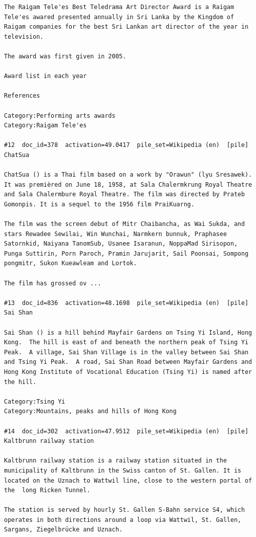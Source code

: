 \begin{verbatim}
The Raigam Tele'es Best Teledrama Art Director Award is a Raigam Tele'es awared presented annually in Sri Lanka by the Kingdom of Raigam companies for the best Sri Lankan art director of the year in television.

The award was first given in 2005.

Award list in each year

References

Category:Performing arts awards
Category:Raigam Tele'es

#12  doc_id=378  activation=49.0417  pile_set=Wikipedia (en)  [pile]
ChatSua

ChatSua () is a Thai film based on a work by "Orawun" (lyu Sresawek). It was premièred on June 18, 1958, at Sala Chalermkrung Royal Theatre and Sala Chalermbure Royal Theatre. The film was directed by Prateb Gomonpis. It is a sequel to the 1956 film PraiKuarng.

The film was the screen debut of Mitr Chaibancha, as Wai Sukda, and stars Rewadee Sewilai, Win Wunchai, Narmkern bunnuk, Praphasee Satornkid, Naiyana TanomSub, Usanee Isaranun, NoppaMad Sirisopon, Punga Suttirin, Porn Paroch, Pramin Jarujarit, Sail Poonsai, Sompong pongmitr, Sukon Kueawleam and Lortok.

The film has grossed ov ...

#13  doc_id=836  activation=48.1698  pile_set=Wikipedia (en)  [pile]
Sai Shan

Sai Shan () is a hill behind Mayfair Gardens on Tsing Yi Island, Hong Kong.  The hill is east of and beneath the northern peak of Tsing Yi Peak.  A village, Sai Shan Village is in the valley between Sai Shan and Tsing Yi Peak.  A road, Sai Shan Road between Mayfair Gardens and Hong Kong Institute of Vocational Education (Tsing Yi) is named after the hill.

Category:Tsing Yi
Category:Mountains, peaks and hills of Hong Kong

#14  doc_id=302  activation=47.9512  pile_set=Wikipedia (en)  [pile]
Kaltbrunn railway station

Kaltbrunn railway station is a railway station situated in the municipality of Kaltbrunn in the Swiss canton of St. Gallen. It is located on the Uznach to Wattwil line, close to the western portal of the  long Ricken Tunnel.

The station is served by hourly St. Gallen S-Bahn service S4, which operates in both directions around a loop via Wattwil, St. Gallen, Sargans, Ziegelbrücke and Uznach.


\end{verbatim}
